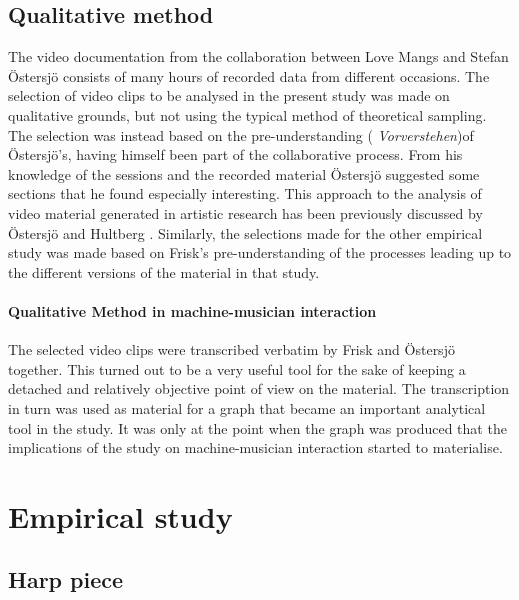 \documentclass[10pt,letterpaper]{article}
\begin{document}
\subsection{Qualitative method}
The video documentation from the collaboration between Love Mangs and
Stefan \"{O}stersj\"{o} consists of many hours of recorded data from
different occasions.  The selection of video clips to be analysed in the
present study was made on qualitative grounds, but not using the typical
method of theoretical sampling. The selection was
instead based on the pre-understanding ({\itshape
Vorverstehen})\footnotemark of 
\"{O}stersj\"{o}'s, having himself been part of the collaborative process. From his
knowledge of the sessions and the recorded material \"{O}stersj\"{o} suggested
some sections that he found especially interesting. This approach to the
analysis of video material generated in artistic research has been
previously discussed by \"{O}stersj\"{o} and Hultberg
\cite{ost05}. Similarly, the selections made for the other empirical
study was made based on Frisk's pre-understanding of the processes
leading up to the different versions of the material in that study.

\paragraph{Qualitative Method in machine-musician interaction}

The selected video clips were transcribed verbatim by Frisk and
\"{O}stersj\"{o} together. This turned out to be a very useful tool for
the sake of keeping a detached and relatively objective point of view on
the material. The transcription in turn was used as material for a graph
that became an important analytical tool in the study. It was only at
the point when the graph was produced that the implications of the study
on machine-musician interaction started to materialise.

\section{Empirical study} \label{empirical}
\subsection{Harp piece} \label{harp}
\end{document}
